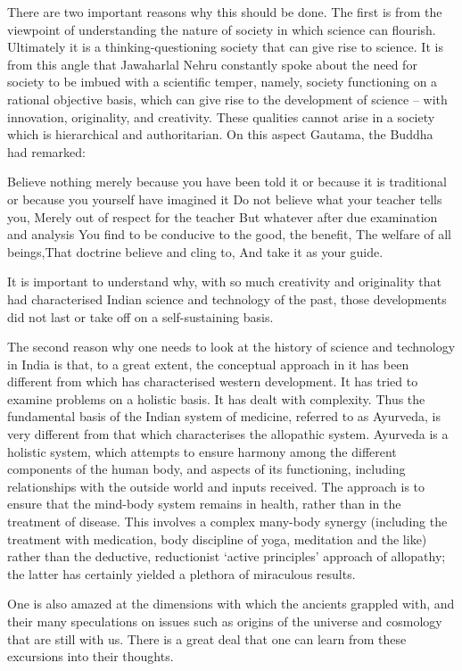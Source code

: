 There are two important reasons why this should be done. The first is from the viewpoint of understanding the nature of society in which science can flourish. Ultimately it is a thinking-questioning society that can give rise to science. It is from this angle that Jawaharlal Nehru constantly spoke about the need for society to be imbued with a scientific temper, namely, society functioning on a rational objective basis, which can give rise to the development of science – with innovation, originality, and creativity. These qualities cannot arise in a society which is hierarchical and authoritarian. On this aspect Gautama, the Buddha had remarked:

Believe nothing merely because you have been told it or because it is traditional or because you yourself have imagined it Do not believe what your teacher tells you, Merely out of respect for the teacher But whatever after due examination and analysis You find to be conducive to the good, the benefit, The welfare of all beings,That doctrine believe and cling to, And take it as your guide.

It is important to understand why, with so much creativity and originality that had characterised Indian science and technology of the past, those developments did not last or take off on a self-sustaining basis.

The second reason why one needs to look at the history of science and technology in India is that, to a great extent, the conceptual approach in it has been different from which has characterised western development. It has tried to examine problems on a holistic basis. It has dealt with complexity. Thus the fundamental basis of the Indian system of medicine, referred to as Ayurveda, is very different from that which characterises the allopathic system. Ayurveda is a holistic system, which attempts to ensure harmony among the different components of the human body, and aspects of its functioning, including relationships with the outside world and inputs received. The approach is to ensure that the mind-body system remains in health, rather than in the treatment of disease. This involves a complex many-body synergy (including the treatment with medication, body discipline of yoga, meditation and the like) rather than the deductive, reductionist ‘active principles’ approach of allopathy; the latter has certainly yielded a plethora of miraculous results.

One is also amazed at the dimensions with which the ancients grappled with, and their many speculations on issues such as origins of the universe and cosmology that are still with us. There is a great deal that one can learn from these excursions into their thoughts.

